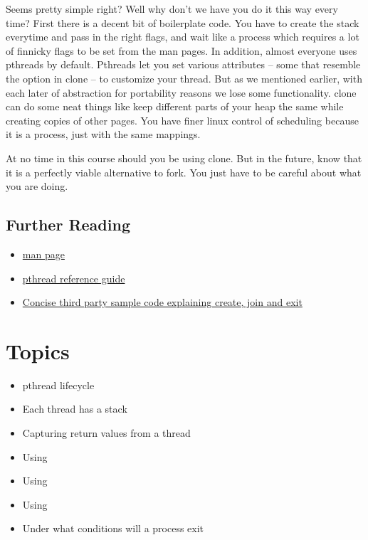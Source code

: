 Seems pretty simple right?
Well why don't we have you do it this way every time?
First there is a decent bit of boilerplate code.
You have to create the stack everytime and pass in the right flags, and wait like a process which requires a lot of finnicky flags to be set from the man pages.
In addition, almost everyone uses pthreads by default.
Pthreads let you set various attributes -- some that resemble the option in clone -- to customize your thread.
But as we mentioned earlier, with each later of abstraction for portability reasons we lose some functionality.
clone can do some neat things like keep different parts of your heap the same while creating copies of other pages.
You have finer linux control of scheduling because it is a process, just with the same mappings.

At no time in this course should you be using clone.
But in the future, know that it is a perfectly viable alternative to fork.
You just have to be careful about what you are doing.

\subsection{Further Reading}

\begin{itemize}
\item \href{http://man7.org/linux/man-pages/man3/pthread_create.3.html}{man page}
\item \href{http://man7.org/linux/man-pages/man7/pthreads.7.html}{pthread reference guide}
\item \href{http://www.thegeekstuff.com/2012/04/terminate-c-thread/}{Concise third party sample code explaining create, join and exit}
\end{itemize}

\section{Topics}

\begin{itemize}
\tightlist
\item
pthread lifecycle
\item
Each thread has a stack
\item
Capturing return values from a thread
\item
Using 
\item
Using 
\item
Using 
\item
Under what conditions will a process exit
\end{itemize}

